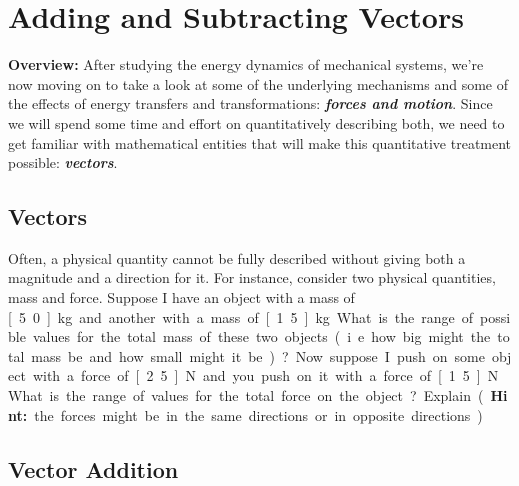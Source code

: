 \section{Adding and Subtracting Vectors}
\label{act6.1.1}

\begin{overview}

\textbf{Overview:} After studying the energy dynamics of mechanical systems, we're now moving on to take a look at some of the underlying mechanisms and some of the effects of energy transfers and transformations: \textbf{\emph{forces and motion}}. Since we will spend some time and effort on quantitatively describing both, we need to get familiar with mathematical entities that will make this quantitative treatment possible: \textbf{\emph{vectors}}.

\end{overview}

\subsection{Vectors}

Often, a physical quantity cannot be fully described without giving both a magnitude and a direction for it. For instance, consider two physical quantities, mass and force. Suppose I have an object with a mass of \unit[5.0]{kg} and another with a mass of \unit[1.5]{kg}. What is the range of possible values for the total mass of these two objects (i.e. how big might the total mass be and how small might it be)?

Now suppose I push on some object with a force of \unit[2.5]{N} and you push on it with a force of \unit[1.5]{N}. What is the range of values for the total force on the object?  Explain. (\textbf{Hint:} the forces might be in the same directions or in opposite directions.)

\WCD

\subsection{Vector Addition}

